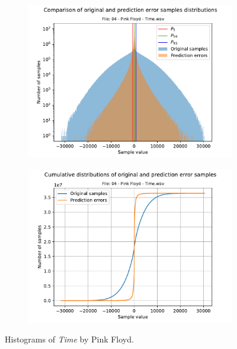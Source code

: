 \begin{figure}[h!]
	\centering
	\begin{subfigure}{0.45\textwidth}
		\centering
		\includegraphics[width=\linewidth]{images/wave_hists/04 - Pink Floyd - Time.wav_hist.pdf}
	\end{subfigure}%
	\begin{subfigure}{0.45\textwidth}
		\centering
		\includegraphics[width=\linewidth]{images/wave_hists/04 - Pink Floyd - Time.wav_hist_cum.pdf}
	\end{subfigure}
	\caption{Histograms of \textit{Time} by Pink Floyd.}
	\label{fig:time_pink_floyd}
\end{figure}


